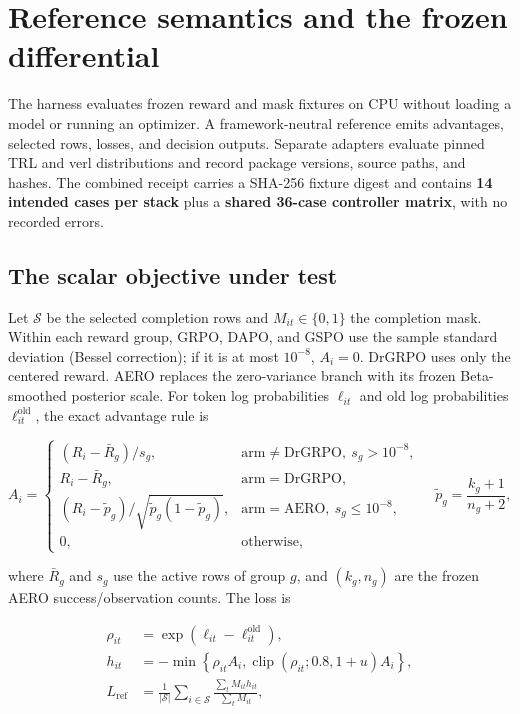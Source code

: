 \section{Reference semantics and the frozen differential}

The harness evaluates frozen reward and mask fixtures on CPU without loading a
model or running an optimizer. A framework-neutral reference emits advantages,
selected rows, losses, and decision outputs. Separate adapters evaluate pinned
TRL and verl distributions and record package versions, source paths, and
hashes. The combined receipt carries a SHA-256 fixture digest and contains
\textbf{14 intended cases per stack} plus a \textbf{shared 36-case controller
matrix}, with no recorded errors.

\subsection{The scalar objective under test}

Let $\mathcal{S}$ be the selected completion rows and $M_{it}\in\{0,1\}$ the
completion mask. Within each reward group, GRPO, DAPO, and GSPO use the sample
standard deviation (Bessel correction); if it is at most $10^{-8}$, $A_i=0$.
DrGRPO uses only the centered reward. AERO replaces the zero-variance branch with
its frozen Beta-smoothed posterior scale. For token log probabilities
$\ell_{it}$ and old log probabilities $\ell^{\mathrm{old}}_{it}$, the exact
advantage rule is

\begin{equation}
A_i=\begin{cases}
(R_i-\bar R_g)/s_g, & \text{arm}\ne\text{DrGRPO},\ s_g>10^{-8},\\[2pt]
R_i-\bar R_g, & \text{arm}=\text{DrGRPO},\\[2pt]
(R_i-\tilde p_g)/\sqrt{\tilde p_g(1-\tilde p_g)},
  & \text{arm}=\text{AERO},\ s_g\leq10^{-8},\\[2pt]
0, & \text{otherwise},
\end{cases}
\quad \tilde p_g=\frac{k_g+1}{n_g+2},
\label{eq:s1-advantage}
\end{equation}

where $\bar R_g$ and $s_g$ use the active rows of group $g$, and $(k_g,n_g)$ are
the frozen AERO success/observation counts. The loss is

\begin{align}
 \rho_{it}&=\exp(\ell_{it}-\ell^{\mathrm{old}}_{it}), \nonumber\\
 h_{it}&=-\min\!\left\{\rho_{it}A_i,
     \operatorname{clip}(\rho_{it};0.8,1+u)A_i\right\}, \nonumber\\
 L_{\mathrm{ref}}&=\frac{1}{|\mathcal{S}|}\sum_{i\in\mathcal{S}}
   \frac{\sum_t M_{it}h_{it}}{\sum_t M_{it}},
 \label{eq:s1-objective}
\end{align}

